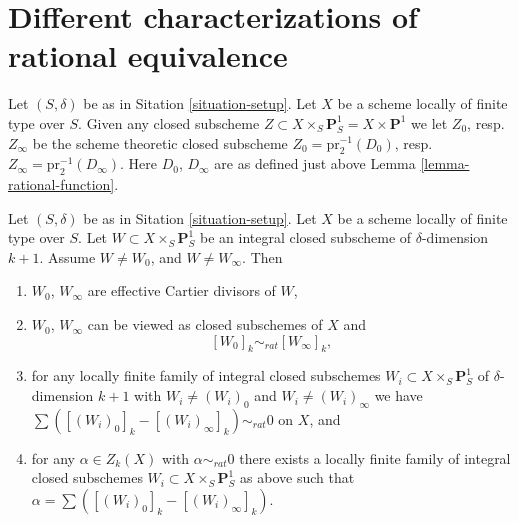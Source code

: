 














\section{Different characterizations of rational equivalence}
\label{section-different-rational-equivalence}

\noindent
Let $(S, \delta)$ be as in Sitation \ref{situation-setup}.
Let $X$ be a scheme locally of finite type over $S$.
Given any closed subscheme
$Z \subset X \times_S \mathbf{P}^1_S = X \times \mathbf{P}^1$
we let $Z_0$, resp.\ $Z_\infty$ be the scheme theoretic closed 
subscheme $Z_0 = \text{pr}_2^{-1}(D_0)$,
resp.\ $Z_\infty = \text{pr}_2^{-1}(D_\infty)$.
Here $D_0$, $D_\infty$ are as defined just above
Lemma \ref{lemma-rational-function}.

\begin{lemma}
\label{lemma-rational-equivalence-family}
Let $(S, \delta)$ be as in Sitation \ref{situation-setup}.
Let $X$ be a scheme locally of finite type over $S$.
Let $W \subset X \times_S \mathbf{P}^1_S$ be an integral
closed subscheme of $\delta$-dimension $k + 1$.
Assume $W \not = W_0$, and $W \not = W_\infty$. Then
\begin{enumerate}
\item $W_0$, $W_\infty$ are effective Cartier divisors of $W$,
\item $W_0$, $W_\infty$ can be viewed as closed subschemes
of $X$ and
$$
[W_0]_k \sim_{rat} [W_\infty]_k,
$$
\item for any locally finite family of
integral closed subschemes
$W_i \subset X \times_S \mathbf{P}^1_S$
of $\delta$-dimension $k + 1$ with $W_i \not = (W_i)_0$ and
$W_i \not = (W_i)_\infty$ we have
$\sum ([(W_i)_0]_k - [(W_i)_\infty]_k) \sim_{rat} 0$
on $X$, and
\item for any $\alpha \in Z_k(X)$ with $\alpha \sim_{rat} 0$
there exists a locally finite family of
integral closed subschemes $W_i \subset X \times_S \mathbf{P}^1_S$
as above such that $\alpha = \sum ([(W_i)_0]_k - [(W_i)_\infty]_k)$.
\end{enumerate}
\end{lemma}

